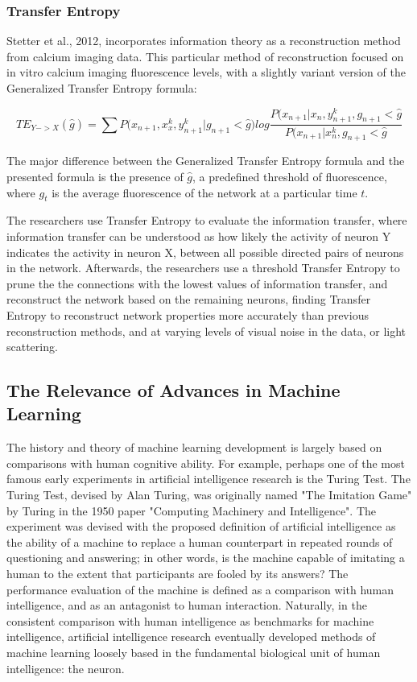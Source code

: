\documentclass[11pt,titlepage]{article}
\begin{document}
\subsubsection{Transfer Entropy}
Stetter et al., 2012, incorporates information theory as a reconstruction method from calcium imaging data. This particular method of reconstruction focused on in vitro calcium imaging fluorescence levels, with a slightly variant version of the Generalized Transfer Entropy formula:

$$TE_{Y->X}(\hat{g}) = \sum{P(x_{n+1}, x_x^k,y_{n+1}^k|g_{n+1}<\hat{g}}) log \frac{P(x_{n+1}|x_n,y_{n+1}^k,g_{n+1}<\hat{g}}{P(x_{n+1}|x_n^k,g_{n+1}<\hat{g}}$$

The major difference between the Generalized Transfer Entropy formula and the presented formula is the presence of $\hat{g}$, a predefined threshold of fluorescence, where $g_t$ is the average fluorescence of the network at a particular time $t$.\par

The researchers use Transfer Entropy to evaluate the information transfer, where information transfer can be understood as how likely the activity of neuron Y indicates the activity in neuron X, between all possible directed pairs of neurons in the network. Afterwards, the researchers use a threshold Transfer Entropy to prune the the connections with the lowest values of information transfer, and reconstruct the network based on the remaining neurons, finding Transfer Entropy to reconstruct network properties more accurately than previous reconstruction methods, and at varying levels of visual noise in the data, or light scattering.\par

\subsection{The Relevance of Advances in Machine Learning}
The history and theory of machine learning development is largely based on comparisons with human cognitive ability. For example, perhaps one of the most famous early experiments in artificial intelligence research is the Turing Test. The Turing Test, devised by Alan Turing, was originally named "The Imitation Game" by Turing in the 1950 paper "Computing Machinery and Intelligence". The experiment was devised with the proposed definition of artificial intelligence as the ability of a machine to replace a human counterpart in repeated rounds of questioning and answering; in other words, is the machine capable of imitating a human to the extent that participants are fooled by its answers? The performance evaluation of the machine is defined as a comparison with human intelligence, and as an antagonist to human interaction. Naturally, in the consistent comparison with human intelligence as benchmarks for machine intelligence, artificial intelligence research eventually developed methods of machine learning loosely based in the fundamental biological unit of human intelligence: the neuron.\par
\end{document}
